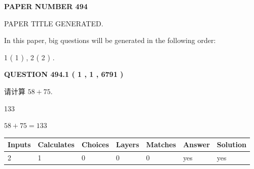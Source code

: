 \documentclass{ctexart}
\begin{document}
   
 {\textbf{ \Large{ PAPER NUMBER  494  }}}
   
   
\vspace{0.2in}
   
   
   
   
   
   
   
   
 \vspace{0.2in}
 
 
 
 
   
   
 PAPER TITLE GENERATED.
   
   
   
\vspace{0.2in}
   
In this paper, big questions will be generated in the following order: 
   
   
   1 ( 1 )
 ,
   2 ( 2 )
 .
  
\vspace{0.2in}
  
{\textbf{\Large{QUESTION
494.1 
 ( 1 , 1 , 6791 )
}}}
  
  
 
请计算 $ %
58 +  %
75 $.
 
 
 
\noindent{}
 
 

133
 
 
\noindent{}
 
 

 
 
 
\noindent{}
 
 

$ %
58 +  %
75=   %
133$
 
 
\noindent{}
 
 

 
   
   
   
   
\noindent\begin{tabular}{|l|l|l|l|l|l|l|}
 \hline
Inputs & Calculates & Choices & Layers & Matches & Answer & Solution \\ \hline
 2  & 
 1  & 
 0
  & 
 0  & 
 0  & 
  yes & 
  yes 
  \\ \hline
 \end{tabular}
   
\end{document}
